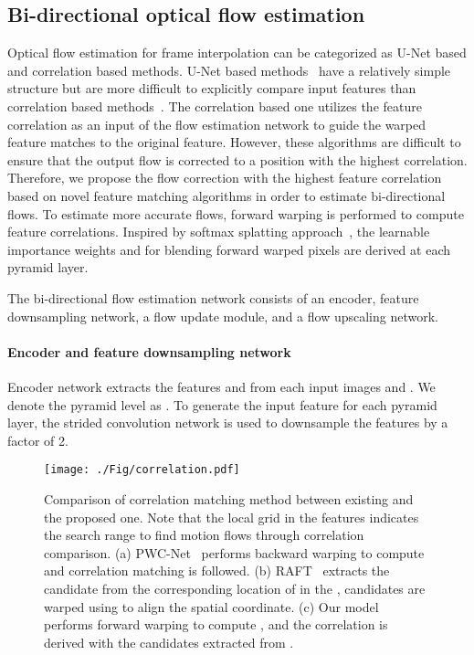\documentclass[10pt,twocolumn,letterpaper]{article}
\begin{document}
\subsection{Bi-directional optical flow estimation}
\label{section:flow}
Optical flow estimation for frame interpolation can be categorized as U-Net based and correlation based methods. 
U-Net based methods~\cite{sim2021xvfi, zhang2020flexible} have a relatively simple structure but are more difficult to explicitly compare input features than correlation based methods~\cite{sun2018pwc, teed2020raft, xu2017accurate}.
The correlation based one utilizes the feature correlation as an input of the flow estimation network to guide the warped feature matches to the original feature. 
However, these algorithms are difficult to ensure that the output flow is corrected to a position with the highest correlation. 
Therefore, we propose the flow correction with the highest feature correlation based on novel feature matching algorithms in order to estimate bi-directional flows. 
To estimate more accurate flows, forward warping is performed to compute feature correlations. 
Inspired by softmax splatting approach~\cite{niklaus2020softmax}, the learnable importance weights  and  for blending forward warped pixels are derived at each pyramid layer.

The bi-directional flow estimation network consists of an encoder, feature downsampling network, a flow update module, and a flow upscaling network.

\paragraph{Encoder and feature downsampling network}  
Encoder network extracts the features  and  from each input images  and . 
We denote the pyramid level as . 
To generate the input feature for each pyramid layer, the strided convolution network is used to downsample the features by a factor of 2. 


\begin{figure}
\centering
\texttt{[image: ./Fig/correlation.pdf]}
\caption{Comparison of correlation matching method between existing and the proposed one. Note that the local grid  in the features indicates the search range to find motion flows through correlation comparison.  (a) PWC-Net~\cite{sun2018pwc} performs backward warping to compute  and correlation matching is followed. 
(b) RAFT~\cite{teed2020raft} extracts the candidate from the corresponding location of  in the , candidates are warped using  to align the spatial coordinate. (c) Our model performs forward warping to compute , and the correlation is derived with the candidates extracted from . }
\label{fig:correlation}
\end{figure}
\end{document}
